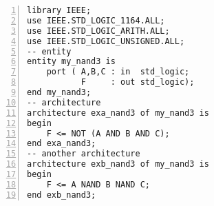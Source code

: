 \begin{minipage}{0.5\linewidth}
\begin{lstlisting}[numbers=left,label=example_1, caption=Solution of Example 1.]
library IEEE;
use IEEE.STD_LOGIC_1164.ALL;
use IEEE.STD_LOGIC_ARITH.ALL;
use IEEE.STD_LOGIC_UNSIGNED.ALL;
-- entity
entity my_nand3 is
	port ( A,B,C : in  std_logic;
	       F     : out std_logic);
end my_nand3;
-- architecture
architecture exa_nand3 of my_nand3 is
begin
	F <= NOT (A AND B AND C);
end exa_nand3;
-- another architecture
architecture exb_nand3 of my_nand3 is
begin
	F <= A NAND B NAND C;
end exb_nand3;
\end{lstlisting}
\end{minipage}
\begin{minipage}{0.4\linewidth}
\begin{flushright}
\end{flushright}
\end{minipage}

